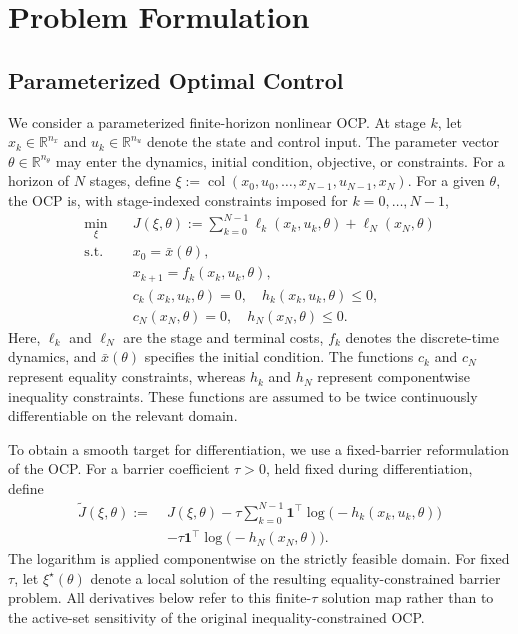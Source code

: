 \documentclass[letterpaper,10pt,conference]{ieeeconf}
\begin{document}
\section{Problem Formulation}
\label{sec:problem}

\subsection{Parameterized Optimal Control}

We consider a parameterized finite-horizon nonlinear OCP. At stage
$k$, let $x_k\in\mathbb{R}^{n_x}$ and
$u_k\in\mathbb{R}^{n_u}$ denote the state and control input. The
parameter vector $\theta\in\mathbb{R}^{n_\theta}$ may enter the
dynamics, initial condition, objective, or constraints. For a horizon
of $N$ stages, define
$\xi:=\operatorname{col}(x_0,u_0,\ldots,x_{N-1},u_{N-1},x_N)$.
For a given $\theta$, the OCP is, with stage-indexed constraints
imposed for $k=0,\ldots,N-1$,
\begin{equation}
\begin{aligned}
\min_{\xi}\quad
& J(\xi,\theta):=
\sum_{k=0}^{N-1}\ell_k(x_k,u_k,\theta)
+\ell_N(x_N,\theta)\\
\mathrm{s.t.}\quad
& x_0=\bar{x}(\theta),\\
& x_{k+1}=f_k(x_k,u_k,\theta),
\\
& c_k(x_k,u_k,\theta)=0,\quad
  h_k(x_k,u_k,\theta)\leq0,
\\
& c_N(x_N,\theta)=0,\quad
  h_N(x_N,\theta)\leq0.
\end{aligned}
\label{eq:ocp}
\end{equation}
Here, $\ell_k$ and $\ell_N$ are the stage and terminal costs,
$f_k$ denotes the discrete-time dynamics, and $\bar{x}(\theta)$
specifies the initial condition. The functions $c_k$ and $c_N$
represent equality constraints, whereas $h_k$ and $h_N$ represent
componentwise inequality constraints. These functions are assumed to
be twice continuously differentiable on the relevant domain.

To obtain a smooth target for differentiation, we use a fixed-barrier
reformulation of the OCP. For a barrier coefficient $\tau>0$, held
fixed during differentiation, define
\begin{equation}
\begin{aligned}
\widetilde J(\xi,\theta)
:=\;&J(\xi,\theta)
-\tau\sum_{k=0}^{N-1}
\mathbf{1}^{\top}
\log\!\bigl(-h_k(x_k,u_k,\theta)\bigr)
\\
&-\tau\mathbf{1}^{\top}
\log\!\bigl(-h_N(x_N,\theta)\bigr).
\end{aligned}
\label{eq:fixed_barrier_objective}
\end{equation}
The logarithm is applied componentwise on the strictly feasible
domain. For fixed $\tau$, let $\xi^\star(\theta)$ denote a local
solution of the resulting equality-constrained barrier problem. All
derivatives below refer to this finite-$\tau$ solution map rather than
to the active-set sensitivity of the original inequality-constrained
OCP.
\end{document}
